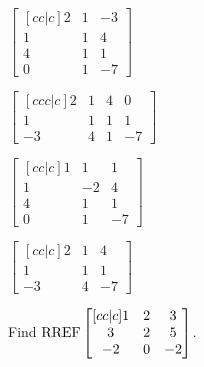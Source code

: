 \documentclass{article}
\begin{document}
\begin{readinessAssuranceTest}
\begin{multicols}{4}
\begin{readinessAssuranceTestChoices}
\item \(
      \begin{bmatrix}[cc|c]
        2 & 1 & -3 \\
        1 & 1 & 4 \\
        4 & 1 & 1 \\
        0 & 1 & -7
      \end{bmatrix}
    \)
\item \(
      \begin{bmatrix}[ccc|c]
        2 & 1 & 4 & 0 \\
        1 & 1 & 1 & 1 \\
        -3 & 4 & 1 & -7
      \end{bmatrix}
    \) %
\item \(
      \begin{bmatrix}[cc|c]
        1 & 1 & 1 \\
        1 & -2 & 4 \\
        4 & 1 & 1 \\
        0 & 1 & -7
      \end{bmatrix}
    \)
\item \(
      \begin{bmatrix}[cc|c]
        2 & 1 & 4\\
        1 & 1 & 1 \\
        -3 & 4 & -7
      \end{bmatrix}
    \)
\end{readinessAssuranceTestChoices}
\end{multicols}

\item Find
  \(\operatorname{RREF}
    \begin{bmatrix}[cc|c]
      1 & 2 & 3 \\
      3 & 2 & 5 \\
      -2 & 0 & -2 \\
    \end{bmatrix}
  \).


\end{readinessAssuranceTest}
\end{document}

